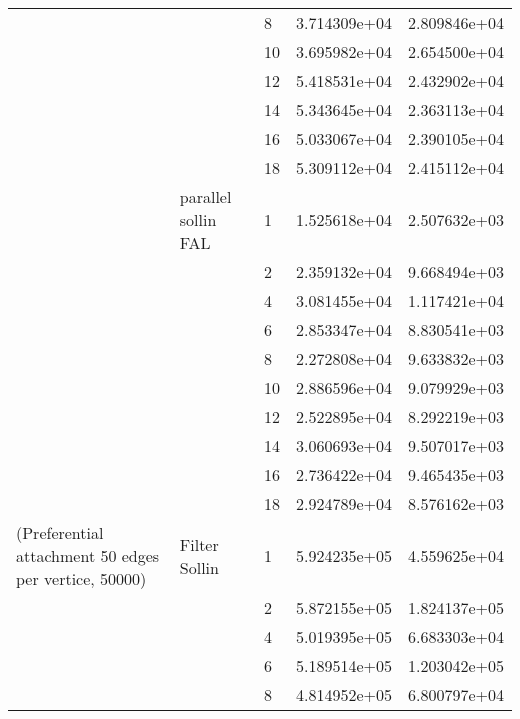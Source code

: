 \begin{tabular}{lllrr}
                      &                     & 8  &  3.714309e+04 &  2.809846e+04 \\
                      &                     & 10 &  3.695982e+04 &  2.654500e+04 \\
                      &                     & 12 &  5.418531e+04 &  2.432902e+04 \\
                      &                     & 14 &  5.343645e+04 &  2.363113e+04 \\
                      &                     & 16 &  5.033067e+04 &  2.390105e+04 \\
                      &                     & 18 &  5.309112e+04 &  2.415112e+04 \\
                      & parallel sollin FAL & 1  &  1.525618e+04 &  2.507632e+03 \\
                      &                     & 2  &  2.359132e+04 &  9.668494e+03 \\
                      &                     & 4  &  3.081455e+04 &  1.117421e+04 \\
                      &                     & 6  &  2.853347e+04 &  8.830541e+03 \\
                      &                     & 8  &  2.272808e+04 &  9.633832e+03 \\
                      &                     & 10 &  2.886596e+04 &  9.079929e+03 \\
                      &                     & 12 &  2.522895e+04 &  8.292219e+03 \\
                      &                     & 14 &  3.060693e+04 &  9.507017e+03 \\
                      &                     & 16 &  2.736422e+04 &  9.465435e+03 \\
                      &                     & 18 &  2.924789e+04 &  8.576162e+03 \\
(Preferential attachment 50 edges per vertice, 50000) & Filter Sollin & 1  &  5.924235e+05 &  4.559625e+04 \\
                      &                     & 2  &  5.872155e+05 &  1.824137e+05 \\
                      &                     & 4  &  5.019395e+05 &  6.683303e+04 \\
                      &                     & 6  &  5.189514e+05 &  1.203042e+05 \\
                      &                     & 8  &  4.814952e+05 &  6.800797e+04 \\

\end{tabular}
